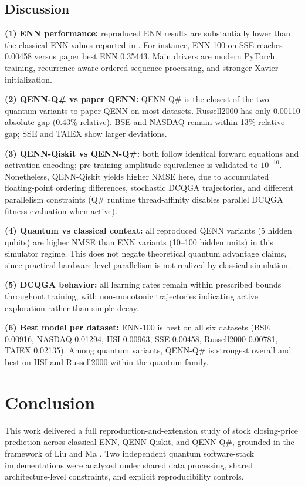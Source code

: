 \documentclass[conference]{IEEEtran}
\begin{document}
\subsection{Discussion}
\textbf{(1) ENN performance:} reproduced ENN results are substantially lower than the classical ENN values reported in \cite{ref43}. For instance, ENN-100 on SSE reaches 0.00458 versus paper best ENN 0.35443. Main drivers are modern PyTorch training, recurrence-aware ordered-sequence processing, and stronger Xavier initialization.

\textbf{(2) QENN-Q\# vs paper QENN:} QENN-Q\# is the closest of the two quantum variants to paper QENN on most datasets. Russell2000 has only 0.00110 absolute gap (0.43\% relative). BSE and NASDAQ remain within 13\% relative gap; SSE and TAIEX show larger deviations.

\textbf{(3) QENN-Qiskit vs QENN-Q\#:} both follow identical forward equations and activation encoding; pre-training amplitude equivalence is validated to $10^{-10}$. Nonetheless, QENN-Qiskit yields higher NMSE here, due to accumulated floating-point ordering differences, stochastic DCQGA trajectories, and different parallelism constraints (Q\# runtime thread-affinity disables parallel DCQGA fitness evaluation when active).

\textbf{(4) Quantum vs classical context:} all reproduced QENN variants (5 hidden qubits) are higher NMSE than ENN variants (10--100 hidden units) in this simulator regime. This does not negate theoretical quantum advantage claims, since practical hardware-level parallelism is not realized by classical simulation.

\textbf{(5) DCQGA behavior:} all learning rates remain within prescribed bounds throughout training, with non-monotonic trajectories indicating active exploration rather than simple decay.

\textbf{(6) Best model per dataset:} ENN-100 is best on all six datasets (BSE 0.00916, NASDAQ 0.01294, HSI 0.00963, SSE 0.00458, Russell2000 0.00781, TAIEX 0.02135). Among quantum variants, QENN-Q\# is strongest overall and best on HSI and Russell2000 within the quantum family.

\section{Conclusion}
This work delivered a full reproduction-and-extension study of stock closing-price prediction across classical ENN, QENN-Qiskit, and QENN-Q\#, grounded in the framework of Liu and Ma \cite{ref43}. Two independent quantum software-stack implementations were analyzed under shared data processing, shared architecture-level constraints, and explicit reproducibility controls.
\end{document}
